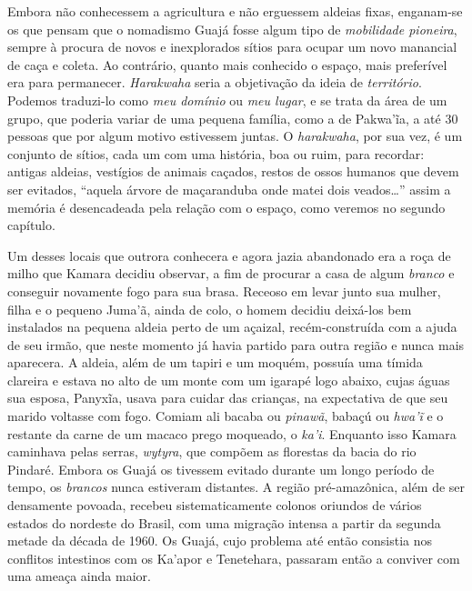 Embora não conhecessem a agricultura e não erguessem aldeias fixas,
enganam-se os que pensam que o nomadismo Guajá fosse algum tipo de
\textit{mobilidade pioneira}, sempre à procura de novos e inexplorados sítios
para ocupar um novo manancial de caça e coleta. Ao contrário, quanto
mais conhecido o espaço, mais preferível era para permanecer.
\textit{Harakwaha} seria a objetivação da ideia de \textit{território}. Podemos
traduzi-lo como \textit{meu domínio} ou \textit{meu lugar}, e se trata da área de
um grupo, que poderia variar de uma pequena família, como a de Pakwa'ĩa,
a até 30 pessoas que por algum motivo estivessem juntas. O
\textit{harakwaha}, por sua vez, é um conjunto de sítios, cada um com uma
história, boa ou ruim, para recordar: antigas aldeias, vestígios de
animais caçados, restos de ossos humanos que devem ser evitados,
``aquela árvore de maçaranduba onde matei dois veados\ldots{}'' assim a
memória é desencadeada pela relação com o espaço, como veremos no
segundo capítulo.

Um desses locais que outrora conhecera e agora jazia abandonado era a roça
de milho que Kamara decidiu observar, a fim de procurar a casa de algum
\textit{branco} e conseguir novamente fogo para sua brasa. Receoso em
levar junto sua mulher, filha e o pequeno Juma'ã, ainda de colo, o homem
decidiu deixá-los bem instalados na pequena aldeia perto de um açaizal,
recém-construída com a ajuda de seu irmão, que neste momento já havia
partido para outra região e nunca mais aparecera. A aldeia, além de um
tapiri e um moquém, possuía uma tímida clareira e estava no alto de um
monte com um igarapé logo abaixo, cujas águas sua esposa, Panyxĩa, usava
para cuidar das crianças, na expectativa de que seu marido voltasse com
fogo. Comiam ali bacaba ou \textit{pinawã}, babaçú ou \textit{hwa'ĩ} e o
restante da carne de um macaco prego moqueado, o \textit{ka'i}. Enquanto
isso Kamara caminhava pelas serras, \textit{wytyra}, que compõem as
florestas da bacia do rio Pindaré. Embora os Guajá os tivessem evitado
durante um longo período de tempo, os \textit{brancos} nunca estiveram
distantes. A região pré-amazônica, além de ser densamente povoada,
recebeu sistematicamente colonos oriundos de vários estados do nordeste
do Brasil, com uma migração intensa a partir da segunda metade da década
de 1960. Os Guajá, cujo problema até então consistia nos conflitos
intestinos com os Ka'apor e Tenetehara, passaram então a conviver com
uma ameaça ainda maior.

